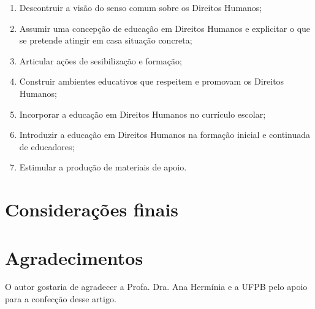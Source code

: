 \documentclass[
	article,			%
	11pt,				%
	oneside,			%
	a4paper,			%
	english,			%
	brazil,				%
	sumario=tradicional
]{abntex2}
\begin{document}
\begin{enumerate}
	\item Descontruir a visão do senso comum sobre os Direitos Humanos;
	\item Assumir uma concepção de educação em Direitos Humanos e explicitar
		  o que se pretende atingir em casa situação concreta;
	\item Articular ações de sesibilização e formação;
	\item Construir ambientes educativos que respeitem e promovam os Direitos
		  Humanos;
	\item Incorporar a educação em Direitos Humanos no currículo escolar;
	\item Introduzir a educação em Direitos Humanos na formação inicial e
		  continuada de educadores;
	\item Estimular a produção de materiais de apoio.
\end{enumerate}



\section{Considerações finais}

\begin{citacao}
\end{citacao}

\postextual




\section*{Agradecimentos}
O autor gostaria de agradecer a Profa. Dra. Ana Hermínia e a UFPB pelo apoio
para a confecção desse artigo.
\end{document}
